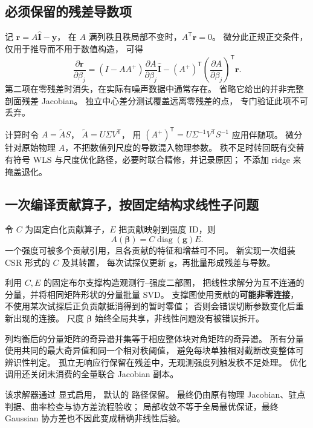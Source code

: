 \documentclass[UTF8,11pt,a4paper,fontset=fandol]{ctexart}
\newcommand{\diag}{\operatorname{diag}}
\newcommand{\T}{^{\mathsf T}}
\begin{document}
\subsection{必须保留的残差导数项}

记 $\bm r=A\widehat{\bm I}-\bm y$，
在 $A$ 满列秩且秩局部不变时，$A\T\bm r=0$。
微分此正规正交条件，仅用于推导而不用于数值构造，
可得
\begin{equation}
\boxed{\quad
\frac{\partial\bm r}{\partial\beta_j}
=(I-AA^+)\frac{\partial A}{\partial\beta_j}\widehat{\bm I}
-(A^+)\T
 \left(\frac{\partial A}{\partial\beta_j}\right)\T\bm r .
\quad}
\label{eq:varproj}
\end{equation}
第二项在零残差时消失，在实际有噪声数据中通常存在。
省略它给出的并非完整剖面残差 Jacobian。
独立中心差分测试覆盖远离零残差的点，
专门验证此项不可丢弃。

计算时令 $A=\widetilde A S$，
$\widetilde A=U\Sigma V\T$，
用
$(A^+)\T=U\Sigma^{-1}V\T S^{-1}$ 应用伴随项。
微分针对原始物理 $A$，不把数值列尺度的导数混入物理参数。
秩不足时转回既有交替有符号 WLS 与尺度优化路径，必要时联合精修，并记录原因；
不添加 ridge 来掩盖退化。

\subsection{一次编译贡献算子，按固定结构求线性子问题}

令 $C$ 为固定白化贡献算子，$E$ 把贡献映射到强度 ID，则
\[
A(\bm\beta)=C\diag(\bm g)E .
\]
一个强度可被多个贡献引用，且各贡献的特征和增益可不同。
新实现一次组装 CSR 形式的 $C$ 及其转置，
每次试探仅更新 $\bm g$，再批量形成残差与导数。

利用 $C,E$ 的固定布尔支撑构造观测行--强度二部图，
把线性求解分为互不连通的分量，并将相同矩阵形状的分量批量 SVD。
支撑图使用贡献的\textbf{可能非零连接}，
不使用某次试探后正负贡献抵消得到的暂时零值；
否则会错误切断参数变化后重新出现的连接。
尺度 $\bm\beta$ 始终全局共享，非线性问题没有被错误拆开。

列均衡后的分量矩阵的奇异谱并集等于相应整体块对角矩阵的奇异谱。
所有分量使用共同的最大奇异值和同一个相对秩阈值，
避免每块单独相对截断改变整体可辨识性判定。
孤立无响应行保留在残差中，无观测强度列触发秩不足处理。
优化调用还关闭未消费的全量联合 Jacobian 副本。

该求解器通过  显式启用，
默认的  路径保留。
最终仍由原有物理 Jacobian、驻点判据、曲率检查与协方差流程验收；
局部收敛不等于全局最优保证，最终 Gaussian 协方差也不因此变成精确非线性后验。
\end{document}

